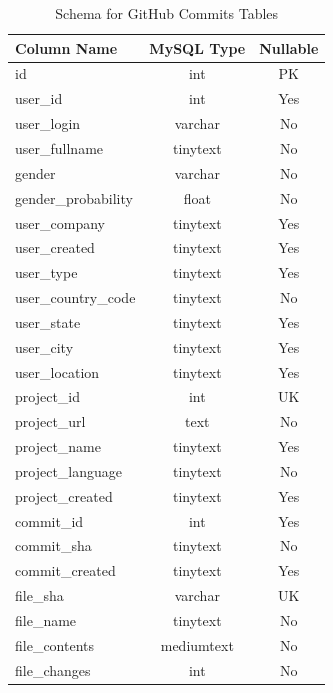 \documentclass[12pt]{article}
\begin{document}
\begin{table}[h!]
    \begin{center}
        \caption{Schema for GitHub Commits Tables}
        \label{tab:git_commit_schema}
        \begin{tabular}{|l | c | c |}
            \hline
            \textbf{Column Name} & \textbf{MySQL Type} & \textbf{Nullable}\\
            \hline
            id & int & PK\\
            user{\_}id & int & Yes\\
            user{\_}login & varchar & No\\
            user{\_}fullname & tinytext & No\\
            gender & varchar & No\\
            gender{\_}probability & float & No\\
            user{\_}company  & tinytext & Yes\\
            user{\_}created & tinytext & Yes\\
            user{\_}type & tinytext & Yes\\
            user{\_}country{\_}code & tinytext & No\\
            user{\_}state & tinytext & Yes\\
            user{\_}city & tinytext & Yes\\
            user{\_}location & tinytext & Yes\\
            \hline
            project{\_}id & int & UK\\
            project{\_}url & text & No\\
            project{\_}name & tinytext & Yes\\
            project{\_}language & tinytext & No\\
            project{\_}created & tinytext & Yes\\
            \hline
            commit{\_}id & int & Yes\\
            commit{\_}sha & tinytext & No\\
            commit{\_}created & tinytext & Yes\\
            \hline
            file{\_}sha & varchar & UK\\
            file{\_}name & tinytext & No\\
            file{\_}contents & mediumtext & No\\
            file{\_}changes & int & No\\
            \hline
        \end{tabular}
    \end{center}
\end{table}
\end{document}
